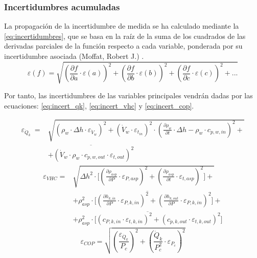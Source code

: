 \documentclass[../main.tex]{subfiles}
\begin{document}
\subsubsection{Incertidumbres acumuladas}

La propagación de la incertidumbre de medida se ha calculado mediante la \ref{eq:incertidumbres}, que se basa en la raíz de la suma de los cuadrados de las derivadas parciales de la función respecto a cada variable, ponderada por su incertidumbre asociada (Moffat, Robert J.) \cite{Moffat1988}.
\begin{equation}
    \varepsilon(f) = \sqrt{\left( \frac{\partial f}{\partial a} \cdot \varepsilon(a) \right)^{2} + \left( \frac{\partial f}{\partial b} \cdot \varepsilon(b) \right)^{2} + \left( \frac{\partial f}{\partial c} \cdot \varepsilon(c) \right)^{2} + ...}
    \label{eq:incertidumbres}
\end{equation}

Por tanto, las incertidumbres de las variables principales vendrán dadas por las ecuaciones: \ref{eq:incert_qk}, \ref{eq:incert_vhc} y \ref{eq:incert_cop}.

\begin{equation}
    \begin{split}
    \varepsilon_{\dot{Q}_{k}} \ = & \sqrt{\left( \rho_{w} \cdot \Delta h \cdot \varepsilon_{\dot{V}_{w}}\right)^{2} + \left(\dot{V}_{w} \cdot \varepsilon_{t_{in}}\right)^{2} \cdot \left(\frac{\partial \rho_{w}}{\partial t} \cdot \Delta h - \rho_{w} \cdot c_{p, w, in}\right)^{2} +} \\
    & \overline{ + \left(\dot{V}_{w} \cdot \rho_{w} \cdot c_{p, w, out} \cdot \varepsilon_{t, out}\right)^{2}}
    \end{split}
    \label{eq:incert_qk}
\end{equation}
\begin{equation}
    \begin{split}
    \varepsilon_{VHC} = &\sqrt{\Delta h^{2} \cdot \Biggl[ \left( \frac{\partial \rho_{asp}}{\partial P} \cdot \varepsilon_{P, asp}\right)^{2} + \left( \frac{\partial \rho_{asp}}{\partial t} \cdot \varepsilon_{t, asp} \right)^{2}
    \Biggr] + } \\
    & \overline{ + \rho_{asp}^{2} \cdot \Biggl[ \left( \frac{\partial h_{k, in}}{\partial P} \cdot \varepsilon_{P, k, in} \right)^{2} + \left( \frac{\partial h_{k, out}}{\partial P} \cdot \varepsilon_{P, k, in}\right)^{2} \Biggr] + } \\
    & \overline{ + \rho_{asp}^{2} \cdot \Biggl[ \left( c_{P, k, in} \cdot \varepsilon_{t, k, in} \right)^2 + \left(
        c_{p, k, out} \cdot \varepsilon_{t, k, out}
     \right)^2 \Biggr]}
    \end{split}
    \label{eq:incert_vhc}
\end{equation}
\begin{equation}
    \varepsilon_{COP} = \sqrt{\left(\frac{\varepsilon_{\dot{Q}_{k}}}{P_{c}}\right)^2+\left(\frac{\dot{Q}_{k}}{P_{c}^{2}}\cdot\varepsilon_{P_{c}}\right)^2}
    \label{eq:incert_cop}
\end{equation}
\end{document}
